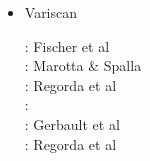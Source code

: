 \begin{itemize}
\item Variscan 

\begin{scriptsize}
\twothousandfour: Fischer et al \cite{fijj04} \\
\twothousandseven: Marotta \& Spalla \cite{masp07} \\
\twothousandthirteen: Regorda et al \cite{rems13} \\
\twothousandseventeen: \cite{regorda} \\
\twothousandeighteen: Gerbault et al \cite{gesr18} \\
\twothousandtwenty: Regorda et al \cite{relr20}
\end{scriptsize}


\end{itemize}






